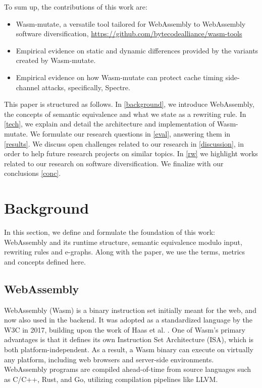 \documentclass[sigplan,screen]{acmart}
\newcommand{\tool}{Wasm-mutate\xspace}
\newcommand{\repourl}{\url{https://github.com/bytecodealliance/wasm-tools}}
\begin{document}
To sum up, the contributions of this work are:

\begin{itemize}
    \item \tool, a versatile tool tailored for WebAssembly to WebAssembly software diversification, \repourl
    \item Empirical evidence on static and dynamic differences provided by the variants created by \tool.
    \item Empirical evidence on how \tool can protect cache timing side-channel attacks, specifically, Spectre.
    
\end{itemize}

This paper is structured as follows. 
In \autoref{background}, we introduce WebAssembly, the concepts of semantic equivalence and what we state as a rewriting rule.
In \autoref{tech}, we explain and detail the architecture and implementation of \tool.
We formulate our research questions in \autoref{eval}, answering them in \autoref{results}.
We discuss open challenges related to our research in \autoref{discussion}, in order to help future research projects on similar topics.
In \autoref{rw} we highlight works related to our research on software diversification.
We finalize with our conclusions \autoref{conc}.

\section{Background}
\label{background}

In this section, we define and formulate the foundation of this work: WebAssembly and its runtime structure, semantic equivalence modulo input, rewriting rules and e-graphs.
Along with the paper, we use the terms, metrics and concepts defined here.

\subsection{WebAssembly}

WebAssembly (Wasm) is a binary instruction set initially  meant for the web, and now also used in the backend. 
It was adopted as a standardized language by the W3C in 2017, building upon the work of Haas et al. \cite{haas2017bringing}. One of Wasm's primary advantages is that it defines its own Instruction Set Architecture (ISA), which is both platform-independent. As a result, a Wasm binary can execute on virtually any platform, including web browsers and server-side environments. 
WebAssembly programs are compiled ahead-of-time from source languages such as C/C++, Rust, and Go, utilizing compilation pipelines like LLVM. 
\end{document}
